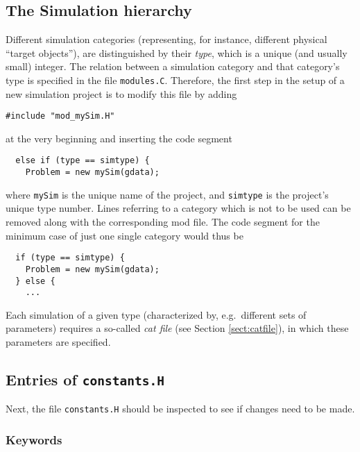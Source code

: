 \subsection{The Simulation hierarchy}
\label{sect:modules}

Different simulation categories (representing, for instance, different
physical ``target objects''), are distinguished by their {\em type},
which is a unique (and usually small) integer. The relation between a
simulation category and that category's type is specified in the file
{\tt modules.C}. Therefore, the first step in the setup of a new
simulation project is to modify this file by adding
\begin{verbatim}
#include "mod_mySim.H"
\end{verbatim}
at the very beginning and inserting the code segment
\begin{verbatim}
  else if (type == simtype) {
    Problem = new mySim(gdata);
\end{verbatim}
where {\tt mySim} is the unique name of the project, and {\tt simtype}
is the project's unique type number. Lines referring to a category
which is not to be used can be removed along with the corresponding
mod file. The code segment for the minimum case of just one single
category would thus be
\begin{verbatim}
  if (type == simtype) {
    Problem = new mySim(gdata);
  } else {
    ...
\end{verbatim}
Each simulation of a given type (characterized by, e.g.\ different
sets of parameters) requires a so-called {\it cat file} (see
Section \ref{sect:catfile}), in which these parameters are specified.

\subsection{Entries of {\tt constants.H}}
\label{sect:constants.H}

Next, the file {\tt constants.H} should be inspected to see if changes
need to be made.

\subsubsection{Keywords}




